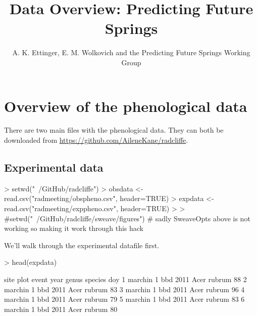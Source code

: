 \documentclass{article}
\begin{document}
% 
\title{Data Overview: Predicting Future Springs} %
\author{A. K. Ettinger, E. M. Wolkovich and the Predicting Future Springs Working Group}
\maketitle  %
\section {Overview of the phenological data}

There are two main files with the phenological data. They can both be downloaded from \url{https://github.com/AileneKane/radcliffe}.

\subsection{Experimental data}


\begin{Schunk}
\begin{Sinput}
> setwd("~/GitHub/radcliffe")
> obsdata <- read.csv("radmeeting/obspheno.csv", header=TRUE)
> expdata <- read.csv("radmeeting/exppheno.csv", header=TRUE)
> 
> #setwd("~/GitHub/radcliffe/sweave/figures") # sadly SweaveOpts above is not working so making it work through this hack
\end{Sinput}
\end{Schunk}
We'll walk through the experimental datafile first. 
\begin{Schunk}
\begin{Sinput}
> head(expdata)
\end{Sinput}
\begin{Soutput}
     site plot event year genus species doy
1 marchin    1   bbd 2011  Acer  rubrum  88
2 marchin    1   bbd 2011  Acer  rubrum  83
3 marchin    1   bbd 2011  Acer  rubrum  96
4 marchin    1   bbd 2011  Acer  rubrum  79
5 marchin    1   bbd 2011  Acer  rubrum  83
6 marchin    1   bbd 2011  Acer  rubrum  80
\end{Soutput}
\end{Schunk}
\end{document}
